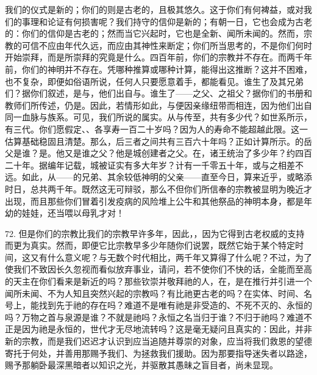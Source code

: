 我们的仪式是新的；你们的则是古老的，且极其悠久。这于你们有何裨益，或对我们的事理和论证有何损害呢？我们持守的信仰是新的；有朝一日，它也会成为古老的：你们的信仰是古老的；然而当它兴起时，它也是全新、闻所未闻的。然而，宗教的可信不应由年代久远，而应由其神性来断定；你们所当思考的，不是你们何时开始崇拜，而是所崇拜的究竟是什么。四百年前，你们的宗教并不存在。而两千年前，你们的神明并不存在。凭哪种推算或哪种计算，能得出这推断？这并不困难，也不复杂，即便如俗语所说，任何人只要愿意着手，都能看见。谁生了及其兄弟们？据你们叙述，是与，他们出自与。谁生了——之父、之祖父？据你们的书册和教师们所传述，仍是。因此，若情形如此，与便因亲缘纽带而相连，因为他们出自同一血脉与族系。可见，我们所说的属实。从与传至，共有多少代？如世系所示，有三代。你们愿假定、、各享寿一百二十岁吗？因为人的寿命不能超越此限。这一估算基础稳固且清楚。那么，后三者之间共有三百六十年吗？正如计算所示。的岳父是谁？是。他又是谁之父？他是城创建者之父。在，诸王统治了多少年？约四百二十年。据编年记载，城被证实有多大年岁？计有一千零五十年，或与之相差不远。如此，从——的兄弟、其余较低神明的父亲——直至今日，算来近乎，或略添时日，总共两千年。既然这无可辩驳，那么不但你们所信奉的宗教被显明为晚近才出现，而且那些你们冒着引发疫病的风险堆上公牛和其他祭品的神明本身，都是年幼的娃娃，还当喂以母乳才对！\par

72. 但是你们的宗教比我们的宗教早许多年，因此，，因为它得到古老权威的支持而更为真实。然而，即便它比宗教早多少年随你们说罢，既然它始于某个特定时间，这又有什么意义呢？与无数个时代相比，两千年又算得了什么呢？不过，为了使我们不致因长久忽视而看似放弃事业，请问，若不使你们不快的话，全能而至高的天主在你们看来是新近的吗？那些钦崇并敬拜祂的人，在，是在推行并引进一个闻所未闻、不为人知且突然兴起的宗教吗？有比祂更古老的吗？在实体、时间、名号上，能找到先于祂的存在吗？难道不是唯有祂是非受造的、不死不灭的、永恒的吗？万物之首与泉源是谁？不就是祂吗？永恒之名当归于谁？不归于祂吗？难道不正是因为祂是永恒的，世代才无尽地流转吗？这是毫无疑问且真实的：因此，并非新的宗教，而是我们迟迟才认识到应当追随并尊崇的对象，应当将我们救恩的望德寄托于何处，并善用那赐予我们、为拯救我们援助。因为那要指导迷失者以路途，赐予那躺卧最深黑暗者以知识之光，并驱散其愚昧之盲目者，尚未显现。\par

